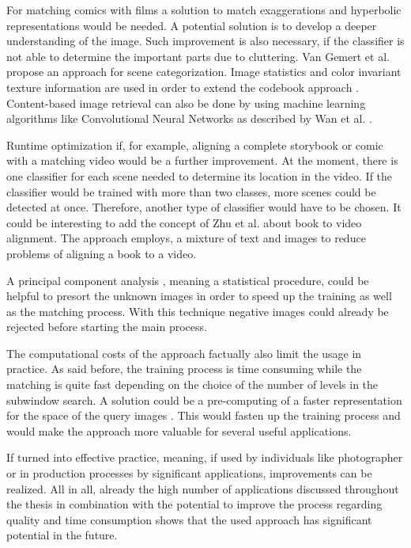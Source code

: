 For matching comics with films a solution to match exaggerations and hyperbolic representations would be needed. A potential solution is to develop a deeper understanding of the image. Such improvement is also necessary, if the classifier is not able to determine the important parts due to cluttering. \cite{shrivastava-sa11} \newline
Van Gemert et al. \cite{gemert} propose an approach for scene categorization. Image statistics and color invariant texture information are used in order to extend the codebook approach \cite{gemert}. \newline
Content-based image retrieval can also be done by using machine learning algorithms like Convolutional Neural Networks as described by Wan et al. \cite{wan}.

Runtime optimization if, for example, aligning a complete storybook or comic with a matching video would be a further improvement. At the moment, there is one classifier for each scene needed to determine its location in the video. If the classifier would be trained with more than two classes, more scenes could be detected at once. Therefore, another type of classifier would have to be chosen. \newline
It could be interesting to add the concept of Zhu et al. \cite{bookVideoAlignment} about book to video alignment. The approach employs, a mixture of text and images to reduce problems of aligning a book to a video. 




A principal component analysis \cite{pearson}, meaning a statistical procedure, could be helpful to presort the unknown images in order to speed up the training as well as the matching process. With this technique negative images could already be rejected before starting the main process.

The computational costs of the approach factually also limit the usage in practice. As said before, the training process is time consuming while the matching is quite fast depending on the choice of the number of levels in the subwindow search. A solution could be a pre-computing of a faster representation for the space of the query images \cite{shrivastava-sa11}.
This would fasten up the training process and would make the approach more valuable for several useful applications.

If turned into effective practice, meaning, if used by individuals like photographer or in production processes by significant applications, improvements can be realized. 
All in all, already the high number of applications discussed throughout the thesis in combination with the potential to improve the process regarding quality and time consumption shows that the used approach has significant potential in the future.
